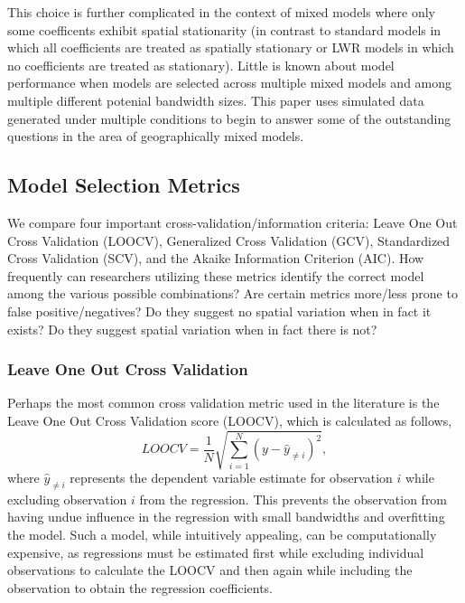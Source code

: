 \documentclass{article}\usepackage[]{graphicx}\usepackage[]{color}
\begin{document}
This choice is further complicated in the context of mixed models where only some coefficents exhibit spatial stationarity (in contrast to standard models in which all coefficients are treated as spatially stationary or LWR models in which no coefficients are treated as stationary). Little is known about model performance when models are selected across multiple mixed models and among multiple different potenial bandwidth sizes. This paper uses simulated data generated under multiple conditions to begin to answer some of the outstanding questions in the area of geographically mixed models. 

\subsection{Model Selection Metrics}
We compare four important cross-validation/information criteria: Leave One Out Cross Validation (LOOCV), Generalized Cross Validation (GCV), Standardized Cross Validation (SCV), and the Akaike Information Criterion (AIC). How frequently can researchers utilizing these metrics identify the correct model among the various possible combinations? Are certain metrics more/less prone to false positive/negatives? Do they suggest no spatial variation when in fact it exists? Do they suggest spatial variation when in fact there is not? 

\subsubsection{Leave One Out Cross Validation}
Perhaps the most common cross validation metric used in the literature is the Leave One Out Cross Validation score (LOOCV), which is calculated as follows,
\begin{equation}\label{eq:LOOCV}
LOOCV = \frac{1}{N} \sqrt{\sum _{i = 1}^{N} (y - \hat{y}_{\neq i})^2},  
\end{equation}
where $\hat{y}_{\neq i}$ represents the dependent variable estimate for observation $i$ while excluding observation $i$ from the regression. This prevents the observation from having undue influence in the regression with small bandwidths and overfitting the model. Such a model, while intuitively appealing, can be computationally expensive, as regressions must be estimated first while excluding individual observations to calculate the LOOCV and then again while including the observation to obtain the regression coefficients.
\end{document}
